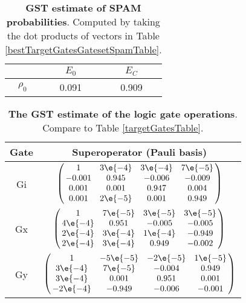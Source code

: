 {\begin{table}[h]
\begin{center}
\begin{tabular}[l]{|c|c|c|}
\hline
 & $E_{0}$ & $E_C$ \\ \hline
$\rho_{0}$ & 0.091 & 0.909 \\ \hline
\end{tabular}

\caption{\textbf{GST estimate of SPAM probabilities}.  Computed by taking the dot products of vectors in Table \ref{bestTargetGatesGatesetSpamTable}.\label{bestTargetGatesGatesetSpamParametersTable}}
\end{center}
\end{table}

\begin{table}[h]
\begin{center}
\begin{tabular}[l]{|c|c|}
\hline
Gate & Superoperator (Pauli basis) \\ \hline
Gi & $ \left(\!\!\begin{array}{cccc}
1 & 3\e{-4} & 3\e{-4} & 7\e{-5} \\ 
-0.001 & 0.945 & -0.006 & -0.009 \\ 
0.001 & 0.001 & 0.947 & 0.004 \\ 
0.001 & 2\e{-5} & 0.001 & 0.949
 \end{array}\!\!\right) $
 \\ \hline
Gx & $ \left(\!\!\begin{array}{cccc}
1 & 7\e{-5} & 3\e{-5} & 3\e{-5} \\ 
4\e{-4} & 0.951 & -0.005 & -0.005 \\ 
2\e{-4} & 3\e{-4} & 1\e{-4} & -0.949 \\ 
2\e{-4} & 3\e{-4} & 0.949 & -0.002
 \end{array}\!\!\right) $
 \\ \hline
Gy & $ \left(\!\!\begin{array}{cccc}
1 & -5\e{-5} & -2\e{-5} & 1\e{-5} \\ 
3\e{-4} & 7\e{-5} & -0.004 & 0.949 \\ 
3\e{-4} & 0.001 & 0.951 & 0.001 \\ 
-2\e{-4} & -0.949 & -0.006 & -0.001
 \end{array}\!\!\right) $
 \\ \hline
\end{tabular}

\caption{\textbf{The GST estimate of the logic gate operations}.  Compare to Table \ref{targetGatesTable}.\label{bestTargetGatesGatesetGatesTable}}
\end{center}
\end{table}

}
